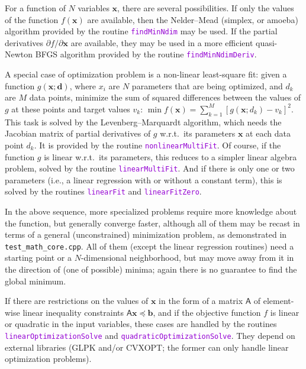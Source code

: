 \documentclass[12pt]{article}
\newcommand{\ttt}[1]{\textcolor{darkviolet}{\texttt{#1}}}
\renewcommand{\d}{\partial}
\newcommand{\bx}{\boldsymbol{x}}
\begin{document}
For a function of $N$ variables $\bx$, there are several possibilities. If only the values of the function $f(\bx)$ are available, then the Nelder--Mead (simplex, or amoeba) algorithm provided by the routine \ttt{findMinNdim} may be used. 
If the partial derivatives $\d f/\d\bx$ are available, they may be used in a more efficient quasi-Newton BFGS algorithm provided by the routine \ttt{findMinNdimDeriv}.

A special case of optimization problem is a non-linear least-square fit: given a function $g(\bx; \boldsymbol{d})$, where $x_i$ are $N$ parameters that are being optimized, and $d_k$ are $M$ data points, minimize the sum of squared differences between the values of $g$ at these points and target values $v_k$: $\min f(\bx) = \sum_{k=1}^M [g(\bx; d_k) - v_k]^2$. This task is solved by the Levenberg--Marquardt algorithm, which needs the Jacobian matrix of partial derivatives of $g$ w.r.t.\ its parameters $\boldsymbol x$ at each data point $d_k$. It is provided by the routine \ttt{nonlinearMultiFit}.
Of course, if the function $g$ is linear w.r.t.\ its parameters, this reduces to a simpler linear algebra problem, solved by the routine \ttt{linearMultiFit}. And if there is only one or two parameters (i.e., a linear regression with or without a constant term), this is solved by the routines \ttt{linearFit} and \ttt{linearFitZero}.

In the above sequence, more specialized problems require more knowledge about the function, but generally converge faster, although all of them may be recast in terms of a general (unconstrained) minimization problem, as demonstrated in \texttt{test_math_core.cpp}.
All of them (except the linear regression routines) need a starting point or a $N$-dimensional neighborhood, but may move away from it in the direction of (one of possible) minima; again there is no guarantee to find the global minimum.

If there are restrictions on the values of $\bx$ in the form of a matrix $\mathsf{A}$ of element-wise linear inequality constraints $\mathsf{A}\bx \preccurlyeq \boldsymbol{b}$, and if the objective function $f$ is linear or quadratic in the input variables, these cases are handled by the routines \ttt{linearOptimizationSolve} and \ttt{quadraticOptimizationSolve}. They depend on external libraries (GLPK and/or CVXOPT; the former can only handle linear optimization problems). 
\end{document}
